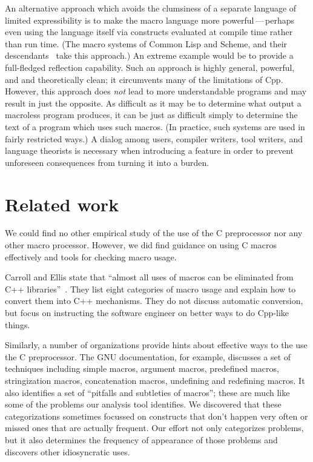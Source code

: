 \documentclass[11pt]{article}
\begin{document}
An alternative approach which avoids the clumsiness of a separate language
of limited expressibility is to make the macro language more
powerful\,---\,perhaps even using the language itself via constructs
evaluated at compile time rather than run time.  (The macro systems of
Common Lisp and Scheme, and their descendants~\cite{WeiseC93} take this
approach.)  An extreme example would be to provide a full-fledged
reflection capability.  Such an approach is highly general, powerful, and
and theoretically clean; it circumvents many of the limitations of Cpp.
However, this approach does {\em not} lead to more understandable programs
and may result in just the opposite.  As difficult as it may be to
determine what output a macroless program produces, it can be just as
difficult simply to determine the text of a program which uses such macros.
(In practice, such systems are used in fairly restricted ways.)  A dialog
among users, compiler writers, tool writers, and language theorists is
necessary when introducing a feature in order to prevent unforeseen
consequences from turning it into a burden.


% 
% 


\section{Related work}
\label{sec:related}

We could find no other empirical study of the use of the C preprocessor nor
any other macro processor.  However, we did find guidance on using C macros
effectively and tools for checking macro usage.

Carroll and Ellis state that ``almost all uses of macros can be eliminated
from C++ libraries''~\cite[p.~146]{Carroll95}.  They list eight categories
of macro usage and explain how to convert them into C++ mechanisms.  They
do not discuss automatic conversion, but focus on instructing the software
engineer on better ways to do Cpp-like things.

Similarly, a number of organizations provide hints about effective ways to
the use the C preprocessor.  The GNU documentation, for example, discusses
a set of techniques including simple macros, argument macros, predefined
macros, stringization macros, concatenation macros, undefining and
redefining macros.  It also identifies a set of ``pitfalls and subtleties
of macros''; these are much like some of the problems our analysis tool
identifies.  We discovered that these categorizations sometimes focussed on
constructs that don't happen very often or missed ones that are actually
frequent.  Our effort not only categorizes problems, but it also determines
the frequency of appearance of those problems and discovers other
idiosyncratic uses.
\end{document}
